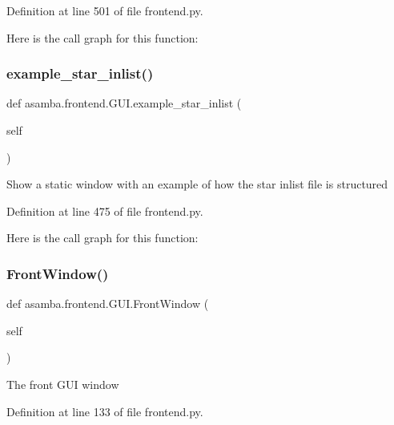 Definition at line 501 of file frontend.\+py.

Here is the call graph for this function\+:
\mbox{\label{classasamba_1_1frontend_1_1_g_u_i_a30a1139534dbd25b7635bd39c649a219}} 
\subsubsection{\texorpdfstring{example\+\_\+star\+\_\+inlist()}{example\_star\_inlist()}}
{\footnotesize\ttfamily def asamba.\+frontend.\+G\+U\+I.\+example\+\_\+star\+\_\+inlist (\begin{DoxyParamCaption}\item[{}]{self }\end{DoxyParamCaption})}

\begin{DoxyVerb}Show a static window with an example of how the star inlist file is structured \end{DoxyVerb}
 

Definition at line 475 of file frontend.\+py.

Here is the call graph for this function\+:
\mbox{\label{classasamba_1_1frontend_1_1_g_u_i_acaec11d5fbe0228d9da0e3ba10a4ea33}} 
\subsubsection{\texorpdfstring{Front\+Window()}{FrontWindow()}}
{\footnotesize\ttfamily def asamba.\+frontend.\+G\+U\+I.\+Front\+Window (\begin{DoxyParamCaption}\item[{}]{self }\end{DoxyParamCaption})}

\begin{DoxyVerb}The front GUI window \end{DoxyVerb}
 

Definition at line 133 of file frontend.\+py.

